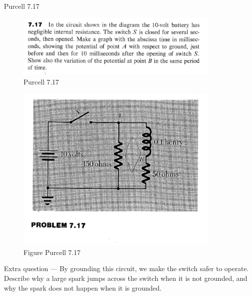 \documentclass[makesolutionspdf]{esg8022pset}
\begin{document}
\begin{problem}{Purcell 7.17}
  \begin{figure}[H]
    \centering
    \includegraphics[width = 10cm]{pu717}
    \caption{Purcell 7.17}
  \end{figure}
  
  \begin{figure}[H]
    \centering
    \includegraphics[width = 10cm]{figpu717}
    \caption{Figure Purcell 7.17}
  \end{figure}

  Extra question --- By grounding this circuit, we make the switch
  safer to operate. Describe why a large spark jumps across the switch
  when it is not grounded, and why the spark does not happen when it is
  grounded.
\end{problem}
\end{document}
